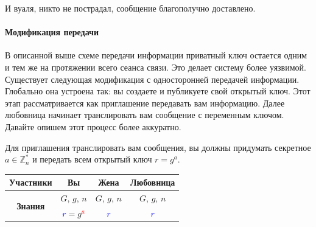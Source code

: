 И вуаля, никто не пострадал, сообщение благополучно доставлено.

\paragraph{Модификация передачи}


В описанной выше схеме передачи информации приватный ключ остается одним и тем же на протяжении всего сеанса связи. Это делает систему более уязвимой. Существует следующая модификация с односторонней передачей информации. Глобально она устроена так: вы создаете и публикуете свой открытый ключ. Этот этап рассматривается как приглашение передавать вам информацию. Далее любовница начинает транслировать вам сообщение с переменным ключом. Давайте опишем этот процесс более аккуратно.

Для приглашения транслировать вам сообщения, вы должны придумать секретное $a\in \mathbb Z_n^*$ и передать всем открытый ключ $r = g^a$.
\begin{center}
\begin{tabular}{|c|c|c|c|}
\hline
{\bf Участники}&{Вы}&{Жена}&{Любовница}\\
\hline
\multirow{2}{*}{\bf Знания}&{\textcolor{OliveGreen}{$G$}, \textcolor{OliveGreen}{$g$}, \textcolor{OliveGreen}{$n$}}&{\textcolor{OliveGreen}{$G$}, \textcolor{OliveGreen}{$g$}, \textcolor{OliveGreen}{$n$}}&{\textcolor{OliveGreen}{$G$}, \textcolor{OliveGreen}{$g$}, \textcolor{OliveGreen}{$n$}}\\
{}&{ \textcolor{blue}{$r$}$=$\textcolor{OliveGreen}{$ g$}\textcolor{red}{${}^a$}}&{\textcolor{blue}{$r$}}&{\textcolor{blue}{$r$}}\\
\hline
\end{tabular}
\end{center}

